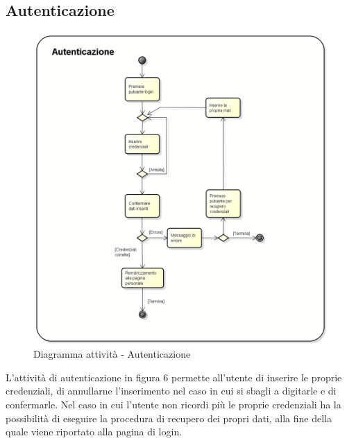 \subsection{Autenticazione}
\begin{figure}[h] 
	\centering 
	\includegraphics[scale=0.3] {img/Activity_autenticazione.png} 
	\caption{Diagramma attività - Autenticazione} 
\end{figure}
L'attività di autenticazione in figura 6 permette all'utente di inserire le proprie credenziali, di annullarne l'inserimento nel caso in cui si sbagli a digitarle e di confermarle. Nel caso in cui l'utente non ricordi più le proprie credenziali ha la possibilità di eseguire la procedura di recupero dei propri dati, alla fine della quale viene riportato alla pagina di login.
\newpage


